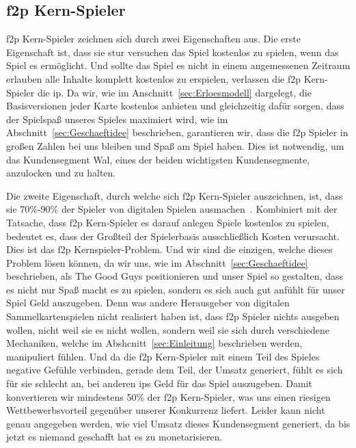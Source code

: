 \documentclass[fontsize=11, a4aper]{scrartcl}
\begin{document}
\subsection{\acl{f2p} Kern-Spieler} \label{subsec:f2p_Kern_-_Spieler}

\acl{f2p} Kern-Spieler zeichnen sich durch zwei Eigenschaften aus. Die erste Eigenschaft ist, dass sie stur versuchen das Spiel kostenlos zu spielen, wenn das Spiel es ermöglicht. Und sollte das Spiel es nicht in einem angemessenen Zeitraum erlauben alle Inhalte komplett kostenlos zu erspielen, verlassen die \ac{f2p} Kern-Spieler die \ac{ip}. Da wir, wie im Anschnitt~\ref{sec:Erloesmodell} dargelegt, die Basisversionen jeder Karte kostenlos anbieten und gleichzeitig dafür sorgen, dass der Spielspaß unseres Spieles maximiert wird, wie im Abschnitt~\ref{sec:Geschaeftidee} beschrieben, garantieren wir, dass die \ac{f2p} Spieler in großen Zahlen bei uns bleiben und Spaß am Spiel haben. Dies ist notwendig, um das Kundensegment \glqq Wal\grqq, eines der beiden wichtigsten Kundensegmente, anzulocken und zu halten.\hfill\newline

\noindent Die zweite Eigenschaft, durch welche sich \ac{f2p} Kern-Spieler auszeichnen, ist, dass sie 70\%-90\% der Spieler von digitalen Spielen ausmachen~\cite{Swrve_2019}. Kombiniert mit der Tatsache, dass \ac{f2p} Kern-Spieler es darauf anlegen Spiele kostenlos zu spielen, bedeutet es, dass der Großteil der Spielerbasis ausschließlich Kosten verursacht. Dies ist das \glqq \acl{f2p} Kernspieler-Problem\grqq. Und wir sind die einzigen, welche dieses Problem lösen können, da wir uns, wie im Abschnitt~\ref{sec:Geschaeftidee} beschrieben, als \glqq The Good Guys\grqq{} positionieren und unser Spiel so gestalten, dass es nicht nur Spaß macht es zu spielen, sondern es sich auch gut anfühlt für unser Spiel Geld auszugeben. Denn was andere Herausgeber von digitalen Sammelkartenspielen nicht realisiert haben ist, dass \ac{f2p} Spieler nichts ausgeben wollen, nicht weil sie es nicht wollen, sondern weil sie sich durch verschiedene Mechaniken, welche im Abshcnitt~\ref{sec:Einleitung} beschrieben werden, manipuliert fühlen. Und da die \ac{f2p} Kern-Spieler mit einem Teil des Spieles negative Gefühle verbinden, gerade dem Teil, der Umsatz generiert, fühlt es sich für sie schlecht an, bei anderen \acp{ip} Geld für das Spiel auszugeben. Damit konvertieren wir mindestens 50\% der \ac{f2p} Kern-Spieler, was uns einen riesigen Wettbewerbsvorteil gegenüber unserer Konkurrenz liefert. Leider kann nicht genau angegeben werden, wie viel Umsatz dieses Kundensegment generiert, da bis jetzt es niemand geschafft hat es zu monetarisieren.
\end{document}
